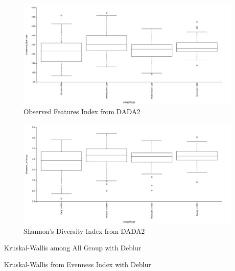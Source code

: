\documentclass[a4paper]{article}
\begin{document}
            \begin{figure}[p]
                \centering
                \includegraphics[width=0.8 \linewidth]{figures/AlphaDiversity/DADA2/observed.png}
                \caption{Observed Features Index from DADA2}
                \label{fig:observed-dada2}
            \end{figure}

            \begin{figure}[p]
                \centering
                \includegraphics[width=0.8 \linewidth]{figures/AlphaDiversity/DADA2/shannon.png}
                \caption{Shannon's Diversity Index from DADA2}
                \label{fig:shannon-dada2}
            \end{figure}

            \begin{table}[p]
                \centering
                \caption{Kruskal-Wallis among All Group with Deblur}
                \label{tb:alpha-all-deblur}
            \end{table}

            \begin{table}[p]
                \centering
                \caption{Kruskal-Wallis from Evenness Index with Deblur}
                \label{tb:alpha-evenness-deblur}
            \end{table}
\end{document}
